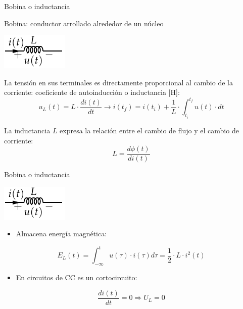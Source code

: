 \documentclass[aspectratio=169, xcolor={usenames,svgnames,dvipsnames}]{beamer}
\begin{document}
\begin{frame}{Bobina o inductancia}

\alert{Bobina:} conductor arrollado alrededor de un núcleo
\begin{center}
\includegraphics[height=0.2\textheight]{../figs/Bobina.pdf}
\end{center}

La tensión en sus terminales es directamente proporcional al cambio de la corriente: coeficiente de autoinducción o \alert{inductancia} [H]:
\[
u_L(t)=L\cdot\frac{di(t)}{dt}\rightarrow
	i(t_f)=i(t_i)+\dfrac{1}{L}\cdot\int_{t_i}^{t_f} u(t)\cdot dt
\]

La inductancia $L$ expresa la relación entre el cambio de flujo y el cambio de corriente:
\begin{equation*}
		L= \dfrac{d\phi(t)}{di(t)}
	\end{equation*}


\end{frame}

\begin{frame}[label={sec:org8fdbc9a}]{Bobina o inductancia}
\begin{center}
\includegraphics[height=0.2\textheight]{../figs/Bobina.pdf}
\end{center}

\begin{itemize}
\item Almacena \alert{energía magnética}:
\end{itemize}
\[
  E_L(t) = \int_{-\infty}^t u(\tau) \cdot i(\tau) d\tau = \frac{1}{2} \cdot L \cdot i^2(t)
\]
\begin{itemize}
\item En circuitos de CC es un \alert{cortocircuito}:
\end{itemize}
\begin{equation*}
  \frac{di(t)}{dt} = 0 \Rightarrow U_L = 0
\end{equation*}
\end{frame}
\end{document}
